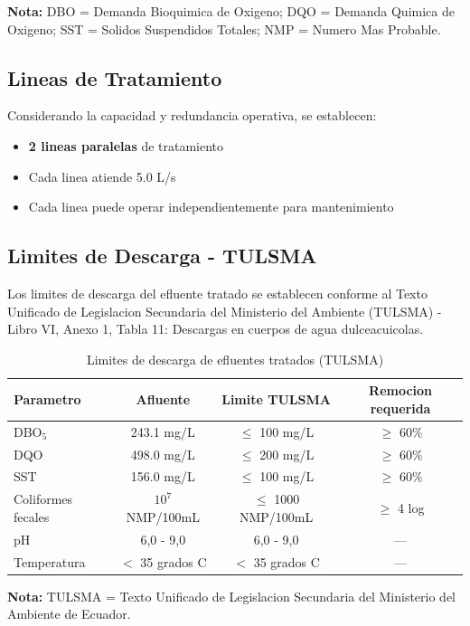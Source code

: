 \documentclass[12pt,a4paper]{article}
\begin{document}
\textbf{Nota:} DBO = Demanda Bioquimica de Oxigeno; DQO = Demanda Quimica de 
Oxigeno; SST = Solidos Suspendidos Totales; NMP = Numero Mas Probable.

\subsection{Lineas de Tratamiento}

Considerando la capacidad y redundancia operativa, se establecen:
\begin{itemize}
    \item \textbf{2 lineas paralelas} de tratamiento
    \item Cada linea atiende 5.0 L/s
    \item Cada linea puede operar independientemente para mantenimiento
\end{itemize}

\subsection{Limites de Descarga - TULSMA}

Los limites de descarga del efluente tratado se establecen conforme al 
Texto Unificado de Legislacion Secundaria del Ministerio del Ambiente 
(TULSMA) - Libro VI, Anexo 1, Tabla 11: Descargas en cuerpos de agua 
dulceacuicolas.

\begin{table}[H]
\centering
\caption{Limites de descarga de efluentes tratados (TULSMA)}
\begin{tabular}{p{5cm}ccc}
\toprule
\textbf{Parametro} & \textbf{Afluente} & \textbf{Limite TULSMA} & \textbf{Remocion requerida} \\
\midrule
DBO$_5$ & 243.1 mg/L & $\leq$ 100 mg/L & $\geq$ 60\% \\
DQO & 498.0 mg/L & $\leq$ 200 mg/L & $\geq$ 60\% \\
SST & 156.0 mg/L & $\leq$ 100 mg/L & $\geq$ 60\% \\
Coliformes fecales & $10^7$ NMP/100mL & $\leq$ 1000 NMP/100mL & $\geq$ 4 log \\
pH & 6,0 - 9,0 & 6,0 - 9,0 & --- \\
Temperatura & $<$ 35 grados C & $<$ 35 grados C & --- \\
\bottomrule
\end{tabular}
\label{tab:limites_tulsa}
\end{table}

\textbf{Nota:} TULSMA = Texto Unificado de Legislacion Secundaria del 
Ministerio del Ambiente de Ecuador.
\end{document}
